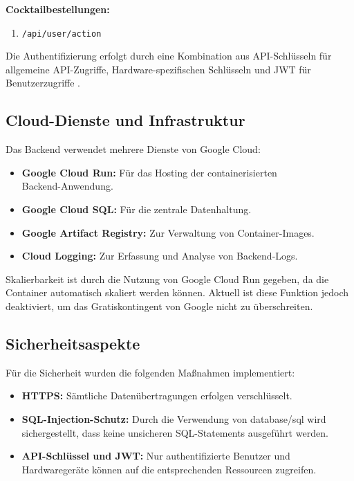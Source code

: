 \vspace{0.5cm}
\textbf{Cocktailbestellungen:}
\begin{enumerate}
  \item \texttt{/api/user/action}
\end{enumerate}

Die Authentifizierung erfolgt durch eine Kombination aus API-Schlüsseln für allgemeine API-Zugriffe, 
Hardware-spezifischen Schlüsseln und JWT für Benutzerzugriffe .

\subsection{Cloud-Dienste und Infrastruktur}

Das Backend verwendet mehrere Dienste von Google Cloud:

\begin{itemize}
	\item \textbf{Google Cloud Run:} Für das Hosting der containerisierten\\
	Backend-Anwendung\cite{googlecloudrun}.
	\item \textbf{Google Cloud SQL:} Für die zentrale Datenhaltung\cite{googlecloudsql}.
	\item \textbf{Google Artifact Registry:} Zur Verwaltung von Container-Images\cite{googleartifactregistry}.
	\item \textbf{Cloud Logging:} Zur Erfassung und Analyse von Backend-Logs\cite{googlecloudlogging}.
\end{itemize}

Skalierbarkeit ist durch die Nutzung von Google Cloud Run gegeben, da die Container automatisch 
skaliert werden können. Aktuell ist diese Funktion jedoch deaktiviert, um das Gratiskontingent von 
Google nicht zu überschreiten.


\subsection{Sicherheitsaspekte}

Für die Sicherheit wurden die folgenden Maßnahmen implementiert:
\begin{itemize}
	\item \textbf{HTTPS:} Sämtliche Datenübertragungen erfolgen verschlüsselt.
	\item \textbf{SQL-Injection-Schutz:} Durch die Verwendung von database/sql wird sichergestellt, 
	dass keine unsicheren SQL-Statements ausgeführt werden.
	\item \textbf{API-Schlüssel und JWT:} Nur authentifizierte Benutzer und Hardwaregeräte können auf 
	die entsprechenden Ressourcen zugreifen.
\end{itemize}


